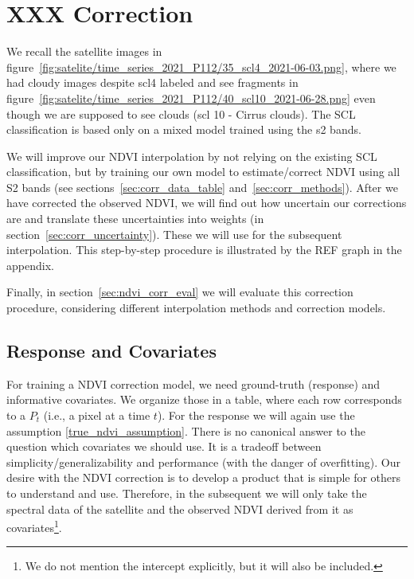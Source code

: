 \section{XXX Correction}{
    {
        We recall the satellite images in figure~\ref{fig:satelite/time_series_2021_P112/35_scl4_2021-06-03.png}, where we had cloudy images despite scl4 labeled and see fragments in figure~\ref{fig:satelite/time_series_2021_P112/40_scl10_2021-06-28.png} even though we are supposed to see clouds (scl 10 - Cirrus clouds). The SCL classification is based only on a mixed model trained using the s2 bands. 
        
        We will improve our NDVI interpolation by not relying on the existing SCL classification, but by training our own model to estimate/correct NDVI using all S2 bands (see sections~\ref{sec:corr_data_table} and~\ref{sec:corr_methods}). After we have corrected the observed NDVI, we will find out how uncertain our corrections are and translate these uncertainties into weights (in section~\ref{sec:corr_uncertainty}). These we will use for the subsequent interpolation. This step-by-step procedure is illustrated by the REF graph in the appendix.

        Finally, in section~\ref{sec:ndvi_corr_eval} we will evaluate this correction procedure, considering different interpolation methods and correction models.
    }

    \subsection{Response and Covariates}{
        \label{sec:corr_data_table}

        For training a NDVI correction model, we need ground-truth (response) and informative covariates. We organize those in a table, where each row corresponds to a $P_t$ (i.e., a pixel at a time $t$). 
        For the response we will again use the assumption \ref{true_ndvi_assumption}. There is no canonical answer to the question which covariates we should use. It is a tradeoff between simplicity/generalizability and performance (with the danger of overfitting). 
        Our desire with the NDVI correction is to develop a product that is simple for others to understand and use. Therefore, in the subsequent we will only take the spectral data of the satellite and the observed NDVI derived from it as covariates\footnote{We do not mention the intercept explicitly, but it will also be included.}.  
    }    

}
